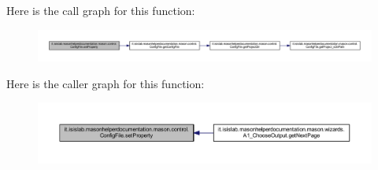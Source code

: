 Here is the call graph for this function\-:
\nopagebreak
\begin{figure}[H]
\begin{center}
\leavevmode
\includegraphics[width=350pt]{classit_1_1isislab_1_1masonhelperdocumentation_1_1mason_1_1control_1_1_config_file_a29d4bd9c148d1d7576cef7bcaf796172_cgraph}
\end{center}
\end{figure}




Here is the caller graph for this function\-:\nopagebreak
\begin{figure}[H]
\begin{center}
\leavevmode
\includegraphics[width=350pt]{classit_1_1isislab_1_1masonhelperdocumentation_1_1mason_1_1control_1_1_config_file_a29d4bd9c148d1d7576cef7bcaf796172_icgraph}
\end{center}
\end{figure}




